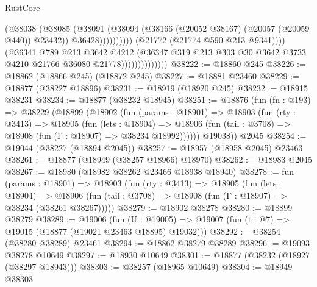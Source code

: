 \begin{lexlean}{RustCore}
\begin{coremodule}
                                              (@38038
                                                (@38085
                                                  (@38091
                                                    (@38094
                                                      (@38166
                                                        (@20052 @38167)
                                                        (@20057 (@20059 @440))
                                                        @23432))
                                                    @36428))))))))))
                                (@21772 (@21774 @590 @213 @9341))))
                            (@36341
                              @789
                              @213
                              @3642
                              @4212
                              (@36347
                                @319
                                @213
                                @303
                                @30
                                @3642
                                @3733
                                @4210
                                @21766
                                @36080
                                @21778))))))))))))))
@38222 := @18860 @245
@38226 := @18862 (@18866 @245) (@18872 @245)
@38227 := @18881 @23460
@38229 := @18877 (@38227 @18896)
@38231 := @18919 (@18920 @245)
@38232 := @18915 @38231
@38234 := @18877 (@38232 @18945)
@38251 := @18876
    (fun (fn : @193) =>
    @38229
      (@18899
        (@18902
          (fun (params : @18901) =>
          @18903
            (fun (rty : @3413) =>
            @18905
              (fun (lets : @18904) =>
              @18906 (fun (tail : @3708) => @18908 (fun (Γ : @18907) => @38234 @18992))))))
        @19038))
    @2045
@38254 := @19044 (@38227 (@18894 @2045))
@38257 := @18957 (@18958 @2045) @23463
@38261 := @18877 (@18949 (@38257 @18966) @18970)
@38262 := @18983 @2045
@38267 := @18980 (@18982 @38262 @23466 @18938 @18940)
@38278 := fun (params : @18901) =>
  @18903
    (fun (rty : @3413) =>
    @18905
      (fun (lets : @18904) =>
      @18906 (fun (tail : @3708) => @18908 (fun (Γ : @18907) => @38234 (@38261 @38267)))))
@38279 := @18902 @38278
@38280 := @18899 @38279
@38289 := @19006
    (fun (U : @19005) => @19007 (fun (t : @7) => @19015 (@18877 (@19021 @23463 @18895) @19032)))
@38292 := @38254 (@38280 @38289) @23461
@38294 := @18862 @38279 @38289
@38296 := @19093 @38278 @10649
@38297 := @18930 @10649
@38301 := @18877 (@38232 (@18927 (@38297 @18943)))
@38303 := @38257 (@18965 @10649)
@38304 := @18949 @38303

\end{coremodule}
\end{lexlean}

